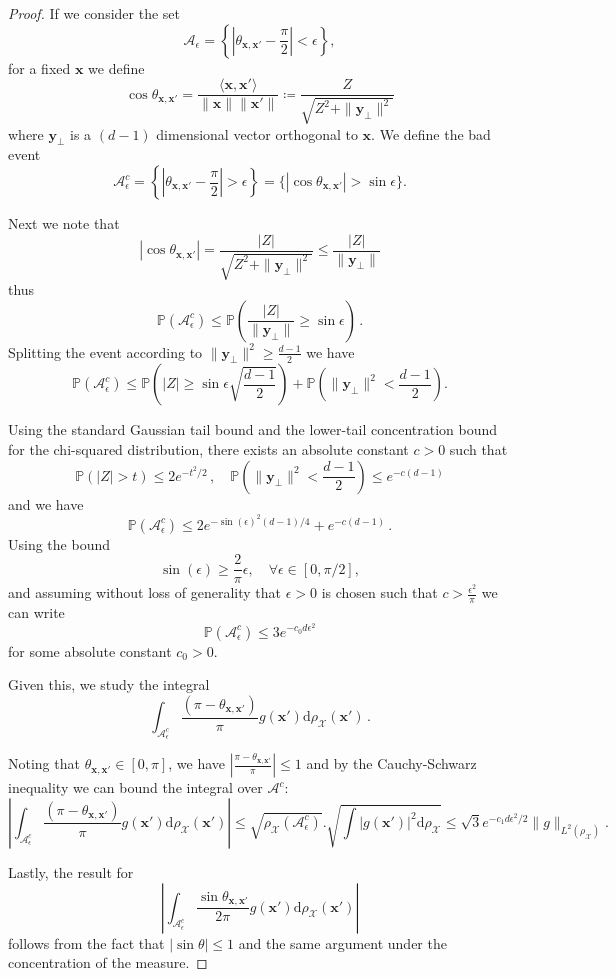 \begin{proof}
    If we consider the set
    \[
        \mathcal{A}_{\epsilon} = \left\{\left|\theta_{\bm x, \bm x'}-\frac{\pi}{2}\right| < \epsilon\right\},
    \] 
    for a fixed $\bm x$ we define
    \[
        \cos \theta_{\bm x, \bm x'} = \frac{\langle \bm x, \bm x'\rangle}{\|\bm x\| \|\bm x'\|} \coloneqq \frac{Z}{\sqrt{Z^2 +\|\bm y_{\perp}\|^2}}
    \]
    where $\bm y_{\perp}$ is a $(d-1)$ dimensional vector orthogonal to $\bm x$. We define the bad event
    \[
        \mathcal A^c_{\epsilon} = \left \{ \left| \theta_{\bm x, \bm x'} - \frac{\pi}{2} \right| > \epsilon \right \} = \Big\{|\cos \theta_{\bm x, \bm x'}| > \sin \epsilon\Big\}.
    \]

    Next we note that
    \[
        |\cos \theta_{\bm x, \bm x'}| = \frac{|Z|}{\sqrt{Z^2 +\|\bm y_{\perp}\|^2}} \leq \frac{|Z|}{\|\bm y_{\perp}\|}
    \]
    thus
    \[
        \mathbb P(\mathcal A_{\epsilon}^c) \leq \mathbb P\left( \frac{|Z|}{\|\bm y_{\perp}\|} \geq \sin \epsilon\right)\, .
    \]
    Splitting the event according to $\|\bm y_{\perp}\|^2 \geq \frac{d-1}{2}$ we have
    \[
        \mathbb P(\mathcal A_{\epsilon}^c) \leq \mathbb P\left( |Z| \geq \sin \epsilon \sqrt{\frac{d-1}{2}}\right) + \mathbb P\left( \|\bm y_{\perp}\|^2 < \frac{d-1}{2}\right).
    \]

    Using the standard Gaussian tail bound and the lower-tail concentration bound for the chi-squared distribution, there exists an absolute constant $c > 0$ such that
    \[
        \mathbb P(|Z| > t) \leq 2e^{-t^2/2}\, , \quad  \mathbb P\left( \|\bm y_{\perp}\|^2 < \frac{d-1}{2}\right) \leq e^{-c(d-1)}
    \]
    and we have
    \[
        \mathbb P(\mathcal A_{\epsilon}^c) \leq 2e^{-\sin(\epsilon)^2(d-1)/4} + e^{-c(d-1)}\, .
    \]
    Using the bound 
    \[
        \sin(\epsilon) \ge \frac{2}{\pi}\epsilon, \quad \forall \epsilon \in [0, \pi/2],
    \]
    and assuming without loss of generality that $\epsilon > 0$ is chosen such that $c > \frac{\epsilon^2}{\pi}$ we can write
    \[
        \mathbb P(\mathcal A_{\epsilon}^c) \leq 3e^{-c_0d\epsilon^2}
    \]
    for some absolute constant $c_0 > 0$.

    Given this, we study the integral
    \[
        \int_{\mathcal{A}^c_{\epsilon}} \frac{(\pi - \theta_{\bm x, \bm x'})}{\pi} g(\bm x') \mathrm d\rho_{\mathcal X}(\bm x')\, .
    \]

    Noting that $\theta_{\bm x, \bm x'} \in [0, \pi]$, we have $\left| \frac{\pi - \theta_{\boldsymbol{x},\boldsymbol{x}'}}{\pi} \right| \le 1$ and by the Cauchy-Schwarz inequality we can bound the integral over $\mathcal{A}^c$:
    \[
        \left| \int_{\mathcal{A}^c_{\epsilon}} \frac{(\pi - \theta_{\bm x, \bm x'})}{\pi} g(\bm x') \mathrm d\rho_{\mathcal X}(\bm x') \right| \leq \sqrt{\rho_{\mathcal X}(\mathcal{A}^c_{\epsilon})}. \sqrt{\int |g(\bm x')|^2 \mathrm d \rho_{\mathcal X}} \leq \sqrt 3 e^{-c_1d\epsilon^2/2}\|g\|_{L^2(\rho_{\mathcal X})}.
    \]

    Lastly, the result for 
    \[
        \left|\int_{\mathcal A^c_{\epsilon}} \frac{\sin \theta_{\bm x, \bm x'}}{2\pi}g(\bm x')\mathrm d\rho_{\mathcal X}(\bm x')\right|
    \]
    follows from the fact that $|\sin \theta| \leq 1$ and the same argument under the concentration of the measure.
\end{proof}